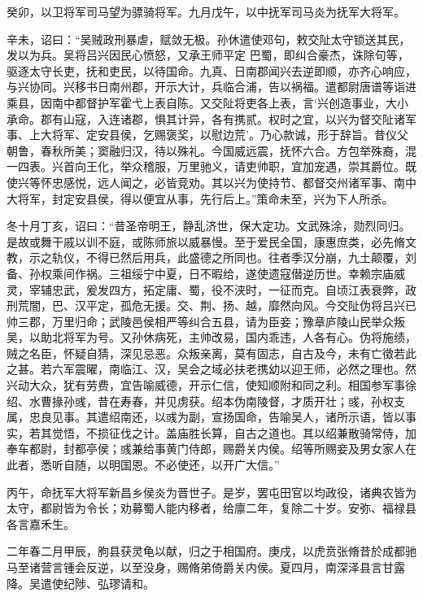 \documentclass[12pt,UTF8]{ctexbook}
\begin{document}
癸卯，以卫将军司马望为骠骑将军。九月戊午，以中抚军司马炎为抚军大将军。

辛未，诏曰：“吴贼政刑暴虐，赋敛无极。孙休遣使邓句，敕交阯太守锁送其民，发以为兵。吴将吕兴因民心愤怒，又承王师平定 巴蜀，即纠合豪杰，诛除句等，驱逐太守长吏，抚和吏民，以待国命。九真、日南郡闻兴去逆即顺，亦齐心响应，与兴协同。兴移书日南州郡，开示大计，兵临合浦，告以祸福。遣都尉唐谱等诣进乘县，因南中都督护军霍弋上表自陈。又交阯将吏各上表，言‘兴创造事业，大小承命。郡有山寇，入连诸郡，惧其计异，各有携贰。权时之宜，以兴为督交阯诸军事、上大将军、定安县侯，乞赐褒奖，以慰边荒’。乃心款诚，形于辞旨。昔仪父朝鲁，春秋所美；窦融归汉，待以殊礼。今国威远震，抚怀六合。方包举殊裔，混一四表。兴首向王化，举众稽服，万里驰义，请吏帅职，宜加宠遇，崇其爵位。既使兴等怀忠感悦，远人闻之，必皆竞劝。其以兴为使持节、都督交州诸军事、南中大将军，封定安县侯，得以便宜从事，先行后上。”策命未至，兴为下人所杀。

冬十月丁亥，诏曰：“昔圣帝明王，静乱济世，保大定功。文武殊涂，勋烈同归。是故或舞干戚以训不庭，或陈师旅以威暴慢。至于爱民全国，康惠庶类，必先脩文教，示之轨仪，不得已然后用兵，此盛德之所同也。往者季汉分崩，九土颠覆，刘备、孙权乘间作祸。三祖绥宁中夏，日不暇给，遂使遗寇僣逆历世。幸赖宗庙威灵，宰辅忠武，爰发四方，拓定庸、蜀，役不浃时，一征而克。自顷江表衰弊，政刑荒闇，巴、汉平定，孤危无援。交、荆、扬、越，靡然向风。今交阯伪将吕兴已帅三郡，万里归命；武陵邑侯相严等纠合五县，请为臣妾；豫章庐陵山民举众叛吴，以助北将军为号。又孙休病死，主帅改易，国内乖违，人各有心。伪将施绩，贼之名臣，怀疑自猜，深见忌恶。众叛亲离，莫有固志，自古及今，未有亡徵若此之甚。若六军震曜，南临江、汉，吴会之域必扶老携幼以迎王师，必然之理也。然兴动大众，犹有劳费，宜告喻威德，开示仁信，使知顺附和同之利。相国参军事徐绍、水曹掾孙彧，昔在寿春，并见虏获。绍本伪南陵督，才质开壮；彧，孙权支属，忠良见事。其遣绍南还，以彧为副，宣扬国命，告喻吴人，诸所示语，皆以事实，若其觉悟，不损征伐之计。盖庙胜长算，自古之道也。其以绍兼散骑常侍，加奉车都尉，封都亭侯；彧兼给事黄门侍郎，赐爵关内侯。绍等所赐妾及男女家人在此者，悉听自随，以明国恩。不必使还，以开广大信。”

丙午，命抚军大将军新昌乡侯炎为晋世子。是岁，罢屯田官以均政役，诸典农皆为太守，都尉皆为令长；劝募蜀人能内移者，给廪二年，复除二十岁。安弥、福禄县各言嘉禾生。

二年春二月甲辰，朐县获灵龟以献，归之于相国府。庚戌，以虎贲张脩昔於成都驰马至诸营言锺会反逆，以至没身，赐脩弟倚爵关内侯。夏四月，南深泽县言甘露降。吴遣使纪陟、弘璆请和。
\end{document}

